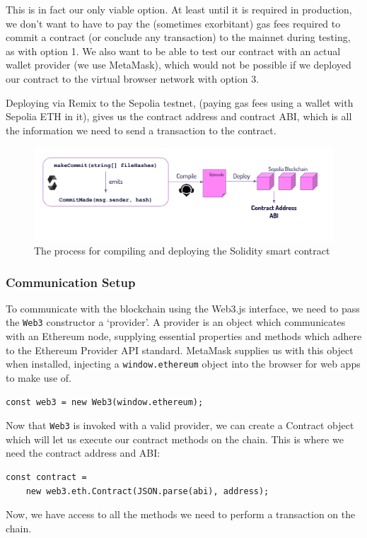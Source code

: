 \documentclass[12pt,a4paper]{article}
\begin{document}
This is in fact our only viable option. At least until it is required in production, we don't want to have to pay the (sometimes exorbitant) gas fees required to commit a contract (or conclude any transaction) to the mainnet during testing, as with option 1. We also want to be able to test our contract with an actual wallet provider (we use MetaMask), which would not be possible if we deployed our contract to the virtual browser network with option 3.

Deploying via Remix to the Sepolia testnet, (paying gas fees using a wallet with Sepolia ETH in it), gives us the contract address and contract ABI, which is all the information we need to send a transaction to the contract. 
\begin{figure}[H]
    \centering
    \includegraphics[scale=0.6]{deploy.png}
    \caption{The process for compiling and deploying the Solidity smart contract}
\end{figure}
\subsubsection{Communication Setup}
To communicate with the blockchain using the Web3.js interface, we need to pass the \verb|Web3| constructor a `provider'.
A provider is an object which communicates with an Ethereum node, supplying essential properties and methods which adhere to the Ethereum Provider API standard. MetaMask supplies us with this object when installed, injecting a \verb|window.ethereum| object into the browser for web apps to make use of.
\begin{lstlisting}
const web3 = new Web3(window.ethereum);
\end{lstlisting}
Now that \verb|Web3| is invoked with a valid provider, we can create a Contract object which will let us execute our contract methods on the chain. This is where we need the contract address and ABI:
\begin{lstlisting}
const contract = 
    new web3.eth.Contract(JSON.parse(abi), address);
\end{lstlisting}
Now, we have access to all the methods we need to perform a transaction on the chain.
\end{document}
